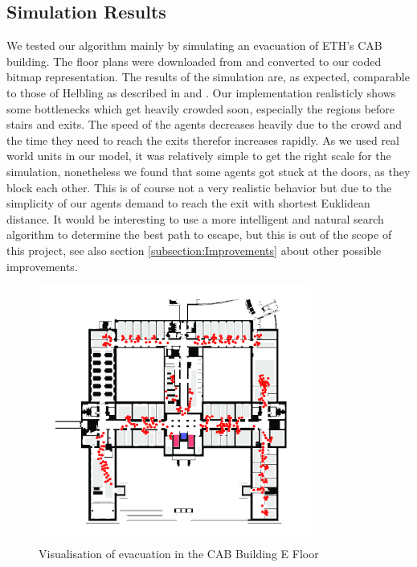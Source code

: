 \documentclass[11pt]{article}
\begin{document}
\subsection{Simulation Results}

We tested our algorithm mainly by simulating an evacuation of ETH's CAB building.
The floor plans were downloaded from \cite{ethfloors} and converted to our coded bitmap representation.
The results of the simulation are, as expected, comparable to those of Helbling as described in \cite{SFMPD} and \cite{SDFEP}.
Our implementation realisticly shows some bottlenecks which get heavily crowded soon, especially the regions before stairs and exits.
The speed of the agents decreases heavily due to the crowd and the time they need to reach the exits therefor increases rapidly.
As we used real world units in our model, it was relatively simple to get the right scale for the simulation,
nonetheless we found that some agents got stuck at the doors, as they block each other.
This is of course not a very realistic behavior but due to the simplicity of our agents demand to reach the
exit with shortest Euklidean distance. It would be interesting to use a more intelligent and natural search 
algorithm to determine the best path to escape, but this is out of the scope of this project, 
see also section \ref{subsection:Improvements} about other possible improvements.

\begin{figure}[ht]
\centering
\includegraphics[width=0.8\textwidth]{./images/cab1.png}
\caption{Visualisation of evacuation in the CAB Building E Floor} 
\label{cab1}
\end{figure}
\end{document}
